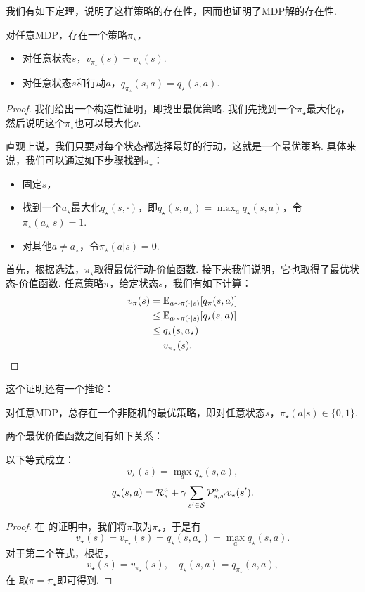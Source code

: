 我们有如下定理，说明了这样策略的存在性，因而也证明了MDP解的存在性. 
\begin{theorem}[MDP解的存在性]\label{theorem:MDP-existence}
对任意MDP，存在一个策略$\pi_\star$，
\begin{itemize}
    \item 对任意状态$s$，$v_{\pi_\star}(s) = v_\star(s)$.
    \item 对任意状态$s$和行动$a$，$q_{\pi_\star}(s,a)=q_\star(s,a)$.
\end{itemize}
\end{theorem}

\begin{proof}
我们给出一个构造性证明，即找出最优策略. 我们先找到一个$\pi_\star$最大化$q$，然后说明这个$\pi_\star$也可以最大化$v$. 

直观上说，我们只要对每个状态都选择最好的行动，这就是一个最优策略. 具体来说，我们可以通过如下步骤找到$\pi_\star$：
\begin{itemize}
    \item 固定$s$，
    \item 找到一个$a_\star$最大化$q_\star(s,\cdot)$，即$q_\star(s,a_\star)=\max_{a}q_\star(s,a)$，令$\pi_\star(a_\star|s)=1$.
    \item 对其他$a\neq a_\star$，令$\pi_\star(a|s)=0$.
\end{itemize}
首先，根据选法，$\pi_\star$取得最优行动-价值函数. 接下来我们说明，它也取得了最优状态-价值函数. 任意策略$\pi$，给定状态$s$，我们有如下计算：
\begin{align*}
    v_\pi(s) &= \mathbb{E}_{a\sim\pi(\cdot|s)}[q_\pi(s,a)]\\
             &\leq \mathbb{E}_{a\sim\pi(\cdot|s)}[q_\star(s,a)]\\
             &\leq q_\star(s,a_\star)\\
             &=v_{\pi_\star}(s).
\end{align*}
\end{proof}
这个证明还有一个推论：
\begin{corollary}
    对任意MDP，总存在一个非随机的最优策略，即对任意状态$s$，$\pi_\star(a|s)\in\{0,1\}$.
\end{corollary}

两个最优价值函数之间有如下关系：
\begin{proposition}\label{proposition:state-action-value-optimal}
以下等式成立：
\[v_\star(s) = \max_a q_\star(s,a),\]
\[q_\star(s,a) = \mathcal R_s^a + \gamma \sum_{s'\in \mathcal S}\mathcal P_{s,s'}^av_\star(s').\]
\end{proposition}
\begin{proof}
    在 的证明中，我们将$\pi$取为$\pi_\star$，于是有
    \[v_\star(s) = v_{\pi_\star}(s) = q_{\star}(s,a_\star) = \max_a q_\star(s,a).\]
    对于第二个等式，根据，
    \[v_\star(s) = v_{\pi_\star}(s),\quad q_\star(s,a) = q_{\pi_\star}(s,a),\]
    在 取$\pi=\pi_\star$即可得到.
\end{proof}

